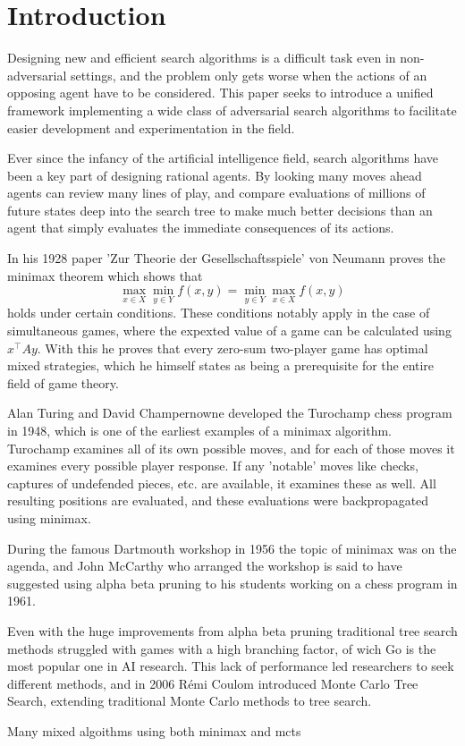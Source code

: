 \section{Introduction}

Designing new and efficient search algorithms is a difficult task even 
in non-adversarial settings, and the problem only gets worse when the 
actions of an opposing agent have to be considered. This paper seeks
to introduce a unified framework implementing a wide class of adversarial
search algorithms to facilitate easier development and experimentation
in the field. 

Ever since the infancy of the artificial intelligence field, search
algorithms have been a key part of designing rational agents. By
looking many moves ahead agents can review many lines of play, and
compare evaluations of millions of future states deep into the search
tree to make much better decisions than an agent that simply evaluates
the immediate consequences of its actions.

In his 1928 paper 'Zur Theorie der Gesellschaftsspiele' von Neumann
proves the minimax theorem which shows that
\begin{equation}
    \max_{x\in X}\min_{y\in Y} f(x, y) = \min_{y\in Y}\max_{x\in X} f(x, y)   
\end{equation}
holds under certain conditions. These conditions notably apply in the
case of simultaneous games, where the expexted value of a game can be
calculated using $x^\intercal Ay$. With this he proves that every zero-sum two-player game has
optimal mixed strategies, which he himself states as being a prerequisite
for the entire field of game theory. 

Alan Turing and David Champernowne developed the Turochamp chess program
in 1948, which is one of the earliest examples of a minimax algorithm.
Turochamp examines all of its own possible moves, and for each of those
moves it examines every possible player response. If any 'notable' moves
like checks, captures of undefended pieces, etc. are available, it
examines these as well. All resulting positions are evaluated, and these
evaluations were backpropagated using minimax. 

During the famous Dartmouth workshop in 1956 the topic of minimax was
on the agenda, and John McCarthy who arranged the workshop is said to 
have suggested using alpha beta pruning to his students working on a 
chess program in 1961.

Even with the huge improvements from alpha beta pruning traditional
tree search methods struggled with games with a high branching factor,
of wich Go is the most popular one in AI research. This lack of
performance led researchers to seek different methods, and in 2006 
Rémi Coulom introduced Monte Carlo Tree Search, extending
traditional Monte Carlo methods to tree search.

Many mixed algoithms using both minimax and mcts 
